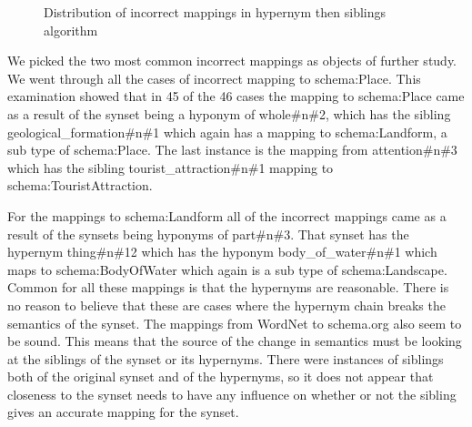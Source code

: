 \begin{figure}[ht]
	\centering
	\caption{Distribution of incorrect mappings in hypernym then siblings algorithm}
	\label{fig:incorrect}
\end{figure}

We picked the two most common incorrect mappings as objects of further study.
We went through all the cases of incorrect mapping to schema:Place.
This examination showed that in 45 of the 46 cases the mapping to schema:Place came as a result of
the synset being a hyponym of whole\#n\#2, which has the sibling geological\_formation\#n\#1 which again has a mapping to
schema:Landform, a sub type of schema:Place.
The last instance is the mapping from attention\#n\#3 which has the sibling tourist\_attraction\#n\#1 mapping to
schema:TouristAttraction.

For the mappings to schema:Landform all of the incorrect mappings came as a result of the synsets being hyponyms of part\#n\#3.
That synset has the hypernym thing\#n\#12 which has the hyponym body\_of\_water\#n\#1 which maps
to schema:BodyOfWater which again is a sub type of schema:Landscape.
Common for all these mappings is that the hypernyms are reasonable.
There is no reason to believe that these are cases where the hypernym chain breaks the semantics of the synset.
The mappings from WordNet to schema.org also seem to be sound.
This means that the source of the change in semantics must be looking at the siblings of the synset or its hypernyms.
There were instances of siblings both of the original synset and of the hypernyms,
so it does not appear that closeness to the synset needs to have any influence on whether or not the sibling gives
an accurate mapping for the synset.


